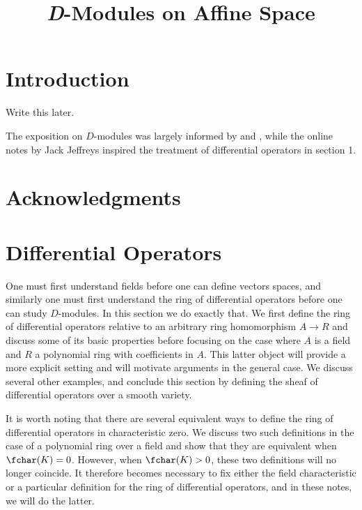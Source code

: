 
\usepackage{indentfirst}

\title{\textit{D}-Modules on Affine Space}
\date{}

\usepackage{titling}
\renewcommand\maketitlehooka{\null\mbox{}\vfill}
\renewcommand\maketitlehookd{\vfill\null}

\maketitle

\newpage

\tableofcontents
\newpage
\section*{Introduction}
Write this later.

The exposition on $D$-modules was largely informed by \cite{d-mod-primer} and \cite{d-mod_ps-rt}, while the online notes \cite{jeffries_d-mod} by Jack Jeffreys inspired the treatment of differential operators in section 1. 

\section*{Acknowledgments}
\newpage
\section{Differential Operators}
One must first understand fields before one can define vectors spaces, and similarly one must first understand the ring of differential operators before one can study $D$-modules. In this section we do exactly that. We first define the ring of differential operators relative to an arbitrary ring homomorphism $A\to R$ and discuss some of its basic properties before focusing on the case where $A$ is a field and $R$ a polynomial ring with coefficients in $A$. This latter object will provide a more explicit setting and will motivate arguments in the general case. We discuss several other examples, and conclude this section by defining the sheaf of differential operators over a smooth variety.

It is worth noting that there are several equivalent ways to define the ring of differential operators in characteristic zero. We discuss two such definitions in the case of a polynomial ring over a field and show that they are equivalent when $\fchar(K) = 0$. However, when $\fchar(K) > 0$, these two definitions will no longer coincide. It therefore becomes necessary to fix either the field characteristic or a particular definition for the ring of differential operators, and in these notes, we will do the latter.

